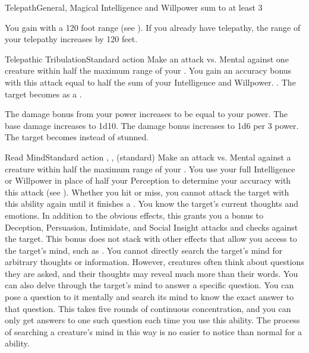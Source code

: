   \begin{magicalfeat}{Telepath}{General, Magical}
    \featpre Intelligence and Willpower sum to at least 3

     You gain  with a 120 foot range (see ).
    If you already have telepathy, the range of your telepathy increases by 120 feet.

    \begin{magicalactiveability}{Telepathic Tribulation}{Standard action}
      \abilitytags {}
      \rankline
      Make an attack vs. Mental against one creature within half the maximum range of your .
      You gain an accuracy bonus with this attack equal to half the sum of your Intelligence and Willpower.
      \hit \damagerankone.
      \injury The target becomes \stunned as a .

      \rankline
       The damage bonus from your power increases to be equal to your power.
       The base damage increases to 1d10.
       The damage bonus increases to 1d6 per 3 power.
       The target becomes \confused instead of stunned.
    \end{magicalactiveability}

    \begin{magicalsustainability}{Read Mind}{Standard action}
      \abilitytags {}, ,  (standard)
      \rankline
      Make an attack vs. Mental against a creature within half the maximum range of your .
      You use your full Intelligence or Willpower in place of half your Perception to determine your accuracy with this attack (see ).
      Whether you hit or miss, you cannot attack the target with this ability again until it finishes a .
      \hit You know the target's current thoughts and emotions.
      In addition to the obvious effects, this grants you a  bonus to Deception, Persuasion, Intimidate, and Social Insight attacks and checks against the target.
      This bonus does not stack with other effects that allow you access to the target's mind, such as .
      You cannot directly search the target's mind for arbitrary thoughts or information.
      However, creatures often think about questions they are asked, and their thoughts may reveal much more than their words.
      \crit You can also delve through the target's mind to answer a specific question.
      You can pose a question to it mentally and search its mind to know the exact answer to that question.
      This takes five rounds of continuous concentration, and you can only get answers to one such question each time you use this ability.
      The process of searching a creature's mind in this way is no easier to notice than normal for a  ability.


\end{magicalsustainability}
\end{magicalfeat}
